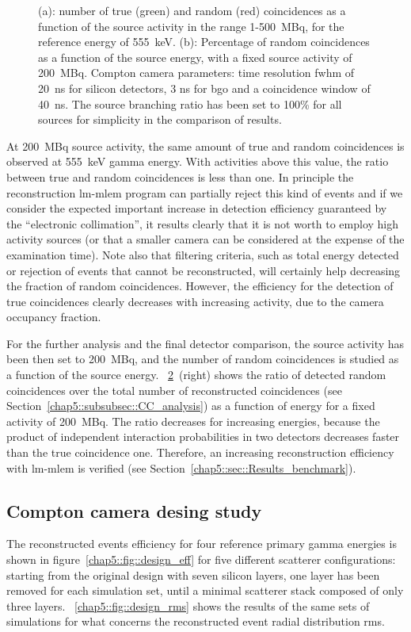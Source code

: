 \begin{figure}
\begin{subfigure}[t]{.5\textwidth}
  \label{chap5::fig::timing_energy}
\end{subfigure}
\caption{(a): number of true (green) and random (red) coincidences as a function of the source activity in the range 1-500~MBq, for the reference energy of 555~keV. (b): Percentage of random coincidences as a function of the source energy, with a fixed source activity of 200~MBq. Compton camera parameters: time resolution \gls{fwhm} of 20~ns for silicon detectors, 3 ns for \gls{bgo} and a coincidence window of 40~ns. The source branching ratio has been set to 100\% for all sources for simplicity in the comparison of results.}
\label{chap5::fig::timig_en_coinc}
\end{figure} 

At 200~MBq source activity, the same amount of true and random coincidences is observed at 555~keV gamma energy. With activities above this value, the ratio between true and random coincidences is less than one. In principle the reconstruction \gls{lm-mlem} program can partially reject this kind of events and if we consider the expected important increase in detection efficiency guaranteed by the \enquote{electronic collimation}, it results clearly that it is not worth to employ high activity sources (or that a smaller camera can be considered at the expense of the examination time). Note also that filtering criteria, such as total energy detected or rejection of events that cannot be reconstructed, will certainly help decreasing the fraction of random coincidences. However, the efficiency for the detection of true coincidences clearly decreases with increasing activity, due to the camera occupancy fraction.

For the further analysis and the final detector comparison, the source activity has been then set to 200~MBq, and the number of random coincidences is studied as a function of the source energy. \figurename~\ref{chap5::fig::timig_en_coinc}~(right) shows the ratio of detected random coincidences over the total number of reconstructed coincidences (see Section~\ref{chap5::subsubsec::CC_analysis}) as a function of energy for a fixed activity of 200~MBq. The ratio decreases for increasing energies, because the product of independent interaction probabilities in two detectors decreases faster than the true coincidence one. Therefore, an increasing reconstruction efficiency with \gls{lm-mlem} is verified (see Section~\ref{chap5::sec::Results_benchmark}).

\subsection{Compton camera desing study}\label{chap5::subsec::Results_CC_SPECT_design}
The reconstructed events efficiency for four reference primary gamma energies is shown in figure~\ref{chap5::fig::design_eff} for five different scatterer configurations: starting from the original design with seven silicon layers, one layer has been removed for each simulation set, until a minimal scatterer stack composed of only three layers. \figurename~\ref{chap5::fig::design_rms} shows the results of the same sets of simulations for what concerns the reconstructed event radial distribution \gls{rms}.  


